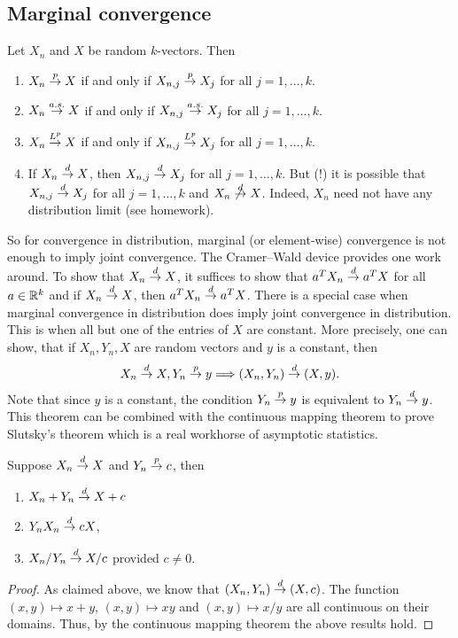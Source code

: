 \subsection{Marginal convergence}
Let $X_n$ and $X$ be random $k$-vectors. Then
\begin{enumerate}
    \item $X_n \stackrel{p}{\to} X$ if and only if $X_{n,j} \stackrel{p}{\to} X_j$ for all $j=1,\ldots, k$.
    \item $X_n \stackrel{a.s.}{\to} X$ if and only if $X_{n,j} \stackrel{a.s.}{\to} X_j$ for all $j=1,\ldots, k$.
    \item $X_n \stackrel{L^{p}}{\to} X$ if and only if $X_{n,j} \stackrel{L^{p}}{\to} X_j$ for all $j=1,\ldots, k$.
    \item If $X_n \stackrel{d}{\to} X$, then $X_{n,j} \stackrel{d}{\to} X_j$ for all $j=1,\ldots, k$. But (!) it is possible that $X_{n,j} \stackrel{d}{\to} X_j$ for all $j=1,\ldots, k$ and $X_n \not\stackrel{d}{\to} X$. Indeed, $X_n$ need not have any distribution limit (see homework).
\end{enumerate}
So for convergence in distribution, marginal (or element-wise) convergence is not enough to imply joint convergence. The Cramer--Wald device provides one work around. To show that $X_n \stackrel{d}{\to} X$, it suffices to show that $a^TX_n \stackrel{d}{\to} a^TX$ for all $a \in {\mathbb R}^k$ and if $X_n \stackrel{d}{\to} X$, then $a^T X_n \stackrel{d}{\to} a^TX$. There is a special case when marginal convergence in distribution does imply joint convergence in distribution. This is when all but one of the entries of $X$ are constant. More precisely, one can show, that if $X_n,Y_n,X$ are random vectors and $y$ is a constant, then
\[X_n \stackrel{d}{\to} X, Y_n \stackrel{p}{\to} y \Longrightarrow (X_n,Y_n) \stackrel{d}{\to} (X,y). \]
Note that since $y$ is a constant, the condition $Y_n \stackrel{p}{\to} y$ is equivalent to $Y_n \stackrel{d}{\to} y$. This theorem can be combined with the continuous mapping theorem to prove Slutsky's theorem which is a real workhorse of asymptotic statistics.
\begin{theorem}[Slutsky's]
    Suppose $X_n \stackrel{d}{\to} X$ and $Y_n \stackrel{p}{\to} c$, then
    \begin{enumerate}
        \item $X_n+Y_n \stackrel{d}{\to} X+c$
        \item $Y_nX_n \stackrel{d}{\to} cX$,
        \item $X_n/Y_n \stackrel{d}{\to} X/c$ provided $c \neq 0$.
    \end{enumerate}
\end{theorem}
\begin{proof}
    As claimed above, we know that $(X_n,Y_n) \stackrel{d}{\to} (X,c)$. The function $(x,y) \mapsto x+y$, $(x,y)\mapsto xy$ and $(x,y) \mapsto x/y$ are all continuous on their domains. Thus, by the continuous mapping theorem the above results hold.
\end{proof}
